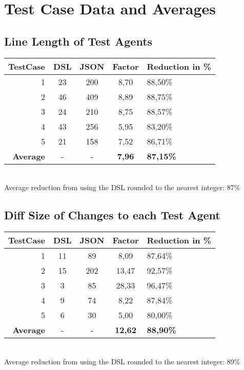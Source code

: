 \chapter{Test Case Data and Averages}
\label{ResultTables}

\section{Line Length of Test Agents}
\begin{tabular}{r|c|c|c|l}
    \textbf{TestCase} & \textbf{DSL} & \textbf{JSON} & \textbf{Factor} & \textbf{Reduction in \%} \\\hline
    1 & 23 & 200 & 8,70 & 88,50\% \\
    2 & 46 & 409 & 8,89 & 88,75\% \\
    3 & 24 & 210 & 8,75 & 88,57\% \\
    4 & 43 & 256 & 5,95 & 83,20\% \\
    5 & 21 & 158 & 7,52 & 86,71\% \\\hline
    \textbf{Average} & - & - & \textbf{7,96} & \textbf{87,15\%} \\
\end{tabular}\\
Average reduction from using the DSL rounded to the nearest integer: 87\%
    

\section{Diff Size of Changes to each Test Agent}
\begin{tabular}{r|c|c|c|l}
    \textbf{TestCase} & \textbf{DSL} & \textbf{JSON} & \textbf{Factor} & \textbf{Reduction in \%} \\\hline
    1 & 11 & 89 & 8,09 & 87,64\% \\
    2 & 15 & 202 & 13,47 & 92,57\% \\
    3 & 3 & 85 & 28,33 & 96,47\% \\
    4 & 9 & 74 & 8,22 & 87,84\% \\
    5 & 6 & 30 & 5,00 & 80,00\% \\\hline
    \textbf{Average} & - & - & \textbf{12,62} & \textbf{88,90\%} \\
\end{tabular}\\
Average reduction from using the DSL rounded to the nearest integer: 89\%